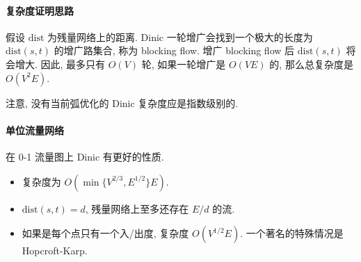 \paragraph{复杂度证明思路}
假设 $\mathrm{dist}$ 为残量网络上的距离.
Dinic 一轮增广会找到一个极大的长度为 $\mathrm{dist} (s, t)$ 的增广路集合, 称为 blocking flow.
增广 blocking flow 后 $\mathrm{dist} (s, t)$ 将会增大.
因此, 最多只有 $O(V)$ 轮, 如果一轮增广是 $O(VE)$ 的,
那么总复杂度是 $O(V^2E)$.

注意, 没有当前弧优化的 Dinic 复杂度应是指数级别的.

\paragraph{单位流量网络}
在 0-1 流量图上 Dinic 有更好的性质. 
\begin{itemize}
	\setlength{\itemsep}{1pt}
	\setlength{\parskip}{0pt}
	\setlength{\parsep}{0pt}
	\item 复杂度为 $O(\min \{V ^ {2/3}, E ^ {1/2}\} E)$.
	\item $\mathrm{dist} (s, t) = d$, 残量网络上至多还存在 $E/d$ 的流.
	\item 如果是每个点只有一个入/出度, 复杂度 $O(V ^ {1 /2 } E)$. 一个著名的特殊情况是 Hopcroft-Karp.
\end{itemize}
